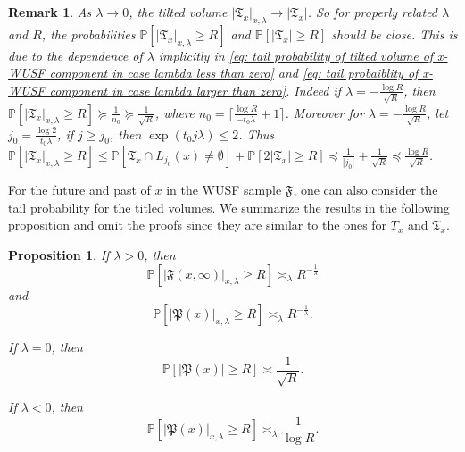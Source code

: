\documentclass[12pt]{article}
\newtheorem{proposition}[theorem]{Proposition}
\newtheorem{remark}[theorem]{Remark}
\numberwithin{equation}{section}
\newcommand{\1}{\mathbf{1}}
\begin{document}
\begin{remark}
	As $\lambda\rightarrow0$, the tilted volume $|\mathfrak{T}_x|_{x,\lambda}\rightarrow|\mathfrak{T}_x|$. So for properly related $\lambda$ and $R$, the probabilities $ \mathbb{P}[|\mathfrak{T}_x|_{x,\lambda}\geq R]$  and $ \mathbb{P}[|\mathfrak{T}_x|\geq R]$   should be close. This is due to the dependence of $\lambda$ implicitly in \eqref{eq: tail probability of tilted volume of x-WUSF component in case lambda less than zero} and \eqref{eq: tail probaiblity of x-WUSF component in case lambda larger than zero}. Indeed if $\lambda=-\frac{\log R}{\sqrt{R}}$, then 
	$\mathbb{P}[|\mathfrak{T}_x|_{x,\lambda}\geq R]\succeq\frac{1}{n_0}\succeq\frac{1}{\sqrt{R}}$, where $n_0=\lceil \frac{\log R}{-t_0\lambda}+1\rceil$. Moreover for $\lambda=-\frac{\log R}{\sqrt{R}}$, let $j_0=\frac{\log 2}{t_0\lambda}$, if $j\geq j_0$, then $\exp(t_0j\lambda)\leq 2$. Thus
	$\mathbb{P}[|\mathfrak{T}_x|_{x,\lambda}\geq R]\leq \mathbb{P}[\mathfrak{T}_x\cap L_{j_0}(x)\neq\emptyset]+\mathbb{P}[2|\mathfrak{T}_x|\geq R]\preceq \frac{1}{|j_0|}+\frac{1}{\sqrt{R}}\preceq \frac{\log R}{\sqrt{R}}$. 
\end{remark}



For the future and past of $x$ in the WUSF sample $\mathfrak{F}$, one can also consider the tail probability for the titled volumes. We summarize the results in the following proposition and omit the proofs since they are similar to the ones for $T_x$ and $\mathfrak{T}_x$. 
\begin{proposition}\label{prop: tail probability for tilted volume of the past and future}
	If $\lambda>0$, then 
	\[
\mathbb{P}[|\mathfrak{F}(x,\infty)|_{x,\lambda}\geq R]\asymp_\lambda  R^{-\frac{1}{\lambda}}
	\]
	and 
	\[
		\mathbb{P}[|\mathfrak{P}(x)|_{x,\lambda}\geq R]
	\asymp_{\lambda} R^{-\frac{1}{\lambda}}.
	\]
	
	If $\lambda=0$, then 
	\[
	\mathbb{P}[|\mathfrak{P}(x)|\geq R]\asymp\frac{1}{\sqrt{R}}.
	\]
	
	If $\lambda<0$, then 
	\[
	\mathbb{P}[|\mathfrak{P}(x)|_{x,\lambda}\geq R]\asymp_\lambda\frac{1}{\log R}.
	\]
\end{proposition}
\end{document}
